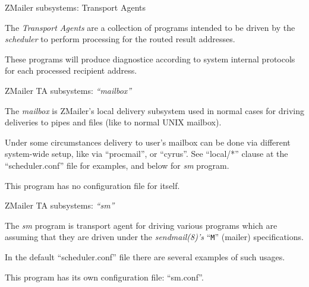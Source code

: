 \documentclass[a4paper,landscape]{slides}
\newcommand{\ZM}{ZMailer}
\begin{document}


\begin{slide}
\centerline{\large \ZM{} subsystems: Transport Agents}

The {\em Transport Agents} are a collection of programs intended
to be driven by the {\em scheduler} to perform processing for
the routed result addresses.

These programs will produce diagnostice according to system internal
protocols for each processed recipient address.

\vfill
\end{slide}


\begin{slide}
\centerline{\large \ZM{} TA subsystems: {\em ``mailbox''}}

The {\em mailbox} is \ZM's local delivery subsystem used in
normal cases for driving deliveries to pipes and files (like
to normal UNIX mailbox).

Under some circumstances delivery to user's mailbox can be
done via different system-wide setup, like via ``procmail'', or ``cyrus''.
See ``local/*'' clause at the ``scheduler.conf'' file for examples,
and below for {\em sm} program.

This program has no configuration file for itself.

\vfill
\end{slide}



\begin{slide}

\centerline{\large \ZM{} TA subsystems: {\em ``sm''}}

The {\em sm} program is transport agent for driving various
programs which are assuming that they are driven under the
{\em sendmail(8)'s} ``\verb!M!'' (mailer) specifications.

In the default ``scheduler.conf'' file there are several
examples of such usages.

This program has its own configuration file: ``sm.conf''.

\vfill
\end{slide}

\end{document}
